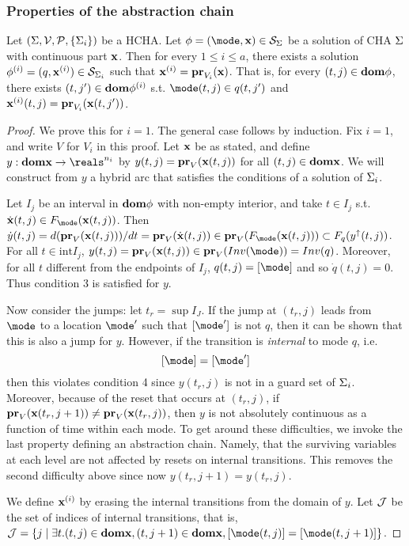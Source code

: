 \subsubsection{Properties of the abstraction chain}
\label{thmAbstractionLevels}
\begin{thm}
	Let $(\Sys,\Vc,\Pc,\{\Sys_i\})$ be a HCHA.
	Let $\hstraj =(\mode,\sttraj) \in \Sc_{\Sys}$ be a solution of CHA $\Sys$ with continuous part $\sttraj$.
	Then for every $1 \leq i \leq a$, 
	there exists a solution 
	$\hstraj^{(i)} = (q,\sttraj^{(i)}) \in \Sc_{\Sys_i}$ 
	such that $\sttraj^{(i)} = \proj{\sttraj}{V_i}$.
	That is, for every $(t,j) \in \dom \hstraj$, there exists $(t,j') \in \dom \hstraj^{(i)}$
	s.t. $\mode(t,j) \in q(t,j')$
	and	$\sttraj^{(i)}(t,j) = \proj{\sttraj(t,j')}{V_i}$.
\end{thm}

\begin{proof}
	We prove this for $i=1$. The general case follows by induction.
	Fix $i=1$, and write $V$ for $V_i$ in this proof.
	Let $\sttraj$ be as stated, and define 
	$y: \dom \sttraj \rightarrow \reals^{n_i}$ by 
	$y(t,j) = \proj{\sttraj(t,j)}{V}$ for all $(t,j) \in \dom \sttraj$.
	We will construct from $y$ a hybrid arc that satisfies the conditions of a solution of $\Sys_i$.
	
	Let $I_j$ be an interval in $\dom \hstraj$ with non-empty interior, and take $t \in I_j$ s.t. 
	$\dot{\sttraj}(t,j) \in F_\mode(\sttraj(t,j))$. 
	Then $\dot{y}(t,j) = d(\proj{\sttraj(t,j)}{V})/dt = \proj{\dot{\sttraj}(t,j)}{V} \in \proj{F_\mode(\sttraj(t,j))}{V} \subset F_q(y^{\uparrow}(t,j))$.	
	For all $t \in \text{int}I_j$, $y(t,j) = \proj{\sttraj(t,j)}{V} \in \proj{Inv(\mode)}{V} = Inv(q)$.
	Moreover, for all $t$ different from the endpoints of $I_j$, $q(t,j) = [\mode]$ and so $\dot{q}(t,j) =0$.
	Thus condition 3 is satisfied for $y$.
	
	Now consider the jumps: let $t_r = \sup I_J$. 
	If the jump at $(t_r,j)$ leads from $\mode$ to a location $\mode'$ such that $[\mode']$ is not $q$, then it can be shown that this is also a jump for $y$.
	However, if the transition is \emph{internal} to mode $q$, i.e. 
	\[[\mode]=[\mode']\]
	then this violates condition 4 since $y(t_r,j)$ is not in a guard set of $\Sys_i$.
	Moreover, because of the reset that occurs at $(t_r,j)$, if $\proj{\sttraj(t_r,j+1)}{V}\neq \proj{\sttraj(t_r,j)}{V}$, then $y$ is not absolutely continuous as a function of time within each mode.
	To get around these difficulties, we invoke the last property defining an abstraction chain.
	Namely, that the surviving variables at each level are not affected by resets on internal transitions.
	This removes the second difficulty above since now $y(t_r,j+1) = y(t_r,j)$.
	
	We define $\sttraj^{(i)}$ by erasing the internal transitions from the domain of $y$.
	Let $\Jc$ be the set of indices of internal transitions, that is, $\Jc = \{j \sut \exists t.(t,j) \in \dom \sttraj, (t,j+1) \in \dom \sttraj, [\mode(t,j)]=[\mode(t,j+1)]\}$.		
	
\end{proof}

